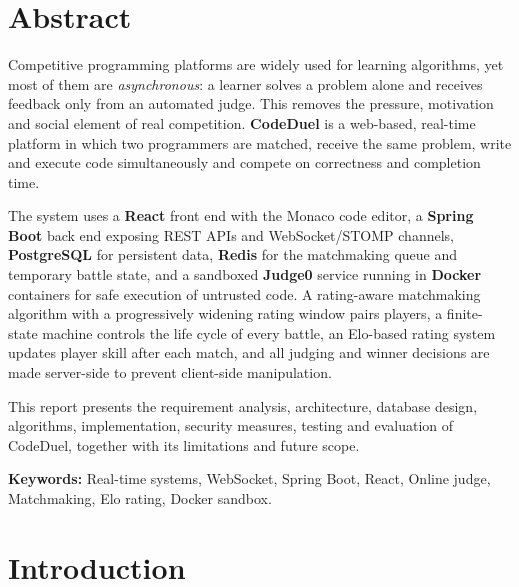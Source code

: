 \documentclass[12pt,a4paper,oneside]{report}
\begin{document}
\chapter*{Abstract}
Competitive programming platforms are widely used for learning algorithms, yet most of them are
\emph{asynchronous}: a learner solves a problem alone and receives feedback only from an automated judge.
This removes the pressure, motivation and social element of real competition.
\textbf{CodeDuel} is a web-based, real-time platform in which two programmers are matched, receive the same
problem, write and execute code simultaneously and compete on correctness and completion time.

The system uses a \textbf{React} front end with the Monaco code editor, a \textbf{Spring Boot} back end
exposing REST APIs and WebSocket/STOMP channels, \textbf{PostgreSQL} for persistent data, \textbf{Redis} for
the matchmaking queue and temporary battle state, and a sandboxed \textbf{Judge0} service running in
\textbf{Docker} containers for safe execution of untrusted code. A rating-aware matchmaking algorithm with a
progressively widening rating window pairs players, a finite-state machine controls the life cycle of every
battle, an Elo-based rating system updates player skill after each match, and all judging and winner
decisions are made server-side to prevent client-side manipulation.

This report presents the requirement analysis, architecture, database design, algorithms, implementation,
security measures, testing and evaluation of CodeDuel, together with its limitations and future scope.

\textbf{Keywords:} Real-time systems, WebSocket, Spring Boot, React, Online judge, Matchmaking, Elo rating, Docker sandbox.

\tableofcontents
\listoffigures
\listoftables

\clearpage
{}

\chapter{Introduction}
\end{document}
